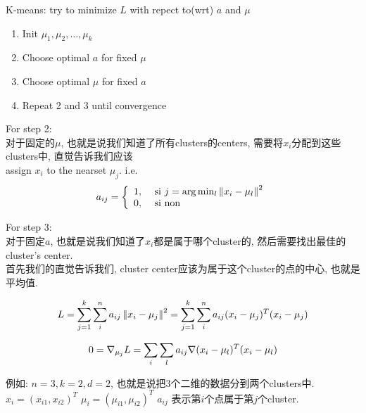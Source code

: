 \documentclass{article}
\begin{document}
K-means: try to minimize $L$ with repect to(wrt) $a$ and $\mu$
\begin{enumerate}
\item Init $\mu_1, \mu_2, \ldots, \mu_k$
\item Choose optimal $a$ for fixed $\mu$
\item Choose optimal $\mu$ for fixed $a$
\item Repeat 2 and 3 until convergence
\end{enumerate}

For step 2:\\
对于固定的$\mu$, 也就是说我们知道了所有clusters的centers, 需要将$x_i$分配到这些clusters中, 直觉告诉我们应该\\
assign $x_i$ to the nearset $\mu_j$. i.e.
$$
a_{ij} =
\left\{
  \begin{array}{ll}
  1, & \textrm{\ si } j = \arg \min_l \left\Vert x_i - \mu_l\right\Vert^2\\
    0, & \textrm{ si non}
  \end{array}
\right.
$$

For step 3:\\
对于固定$a$, 也就是说我们知道了$x_i$都是属于哪个cluster的, 然后需要找出最佳的cluster's center.\\
首先我们的直觉告诉我们, cluster center应该为属于这个cluster的点的中心, 也就是平均值.

$$
\begin{aligned}
\end{aligned}
L
= \sum_{j = 1}^k \sum_i^n a_{ij}\left\Vert x_i - \mu_j\right\Vert^2
= \sum_{j = 1}^k \sum_i^n a_{ij}(x_i - \mu_j)^T (x_i - \mu_j)
$$

$$
0 = \nabla _{\mu_j}{L} = \sum_i \sum_l a_{ij} \nabla (x_i - \mu_l)^T (x_i - \mu_l)
$$

例如: $n=3, k=2, d=2$, 也就是说把3个二维的数据分到两个clusters中.\\
$x_i = (x_{i1}, x_{i2})^T$
$\mu_i = (\mu_{i1}, \mu_{i2})^T$
$a_{ij}$ 表示第$i$个点属于第$j$个cluster.
\end{document}
